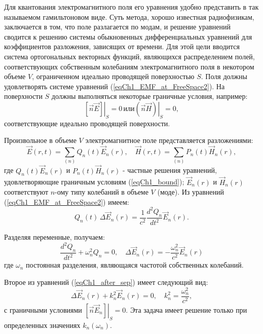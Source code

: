 Для квантования электромагнитного поля его уравнения удобно
представить в так называемом гамильтоновом виде. Суть метода, хорошо
известная радиофизикам, заключается в том, что поле разлагается по
модам, и решение уравнений сводится к решению системы обыкновенных
дифференциальных уравнений для коэффициентов разложения, зависящих от
времени. Для этой цели вводится система ортогональных векторных
функций, являющихся распределением полей, соответствующих собственным
колебаниям электромагнитного поля в некотором объеме  $V$,  ограниченном
идеально проводящей поверхностью  $S$.  Поля должны удовлетворять
системе уравнений (\ref{eqCh1_EMF_at_FreeSpace2}). На поверхности  $S$
должны выполняться некоторые граничные условия, например: 
\begin{equation}
\left. \left[ \vec{n} \vec{E} \right] \right|_S = 0 \,
\mbox{или}
\left. \left( \vec{n} \vec{H} \right) \right|_S = 0,
\label{eqCh1_bound}
\end{equation}
соответствующие идеально проводящей поверхности.

Произвольное в объеме $V$ электромагнитное поле представляется 
разложениями:
\begin{equation}
\vec{E}\left(r, t\right) = \sum_{(n)} Q_n\left(t\right)\vec{E}_n\left(r\right),
\quad
\vec{H}\left(r, t\right) = \sum_{(n)} P_n\left(t\right)\vec{H}_n\left(r\right),
\label{eqCh1_sep0}
\end{equation}
где $Q_n\left(t\right)\vec{E}_n\left(r\right)$ и 
$P_n\left(t\right)\vec{H}_n\left(r\right)$  - 
частные решения уравнений, удовлетворяющие граничным условиям
(\ref{eqCh1_bound}); $\vec{E}_n\left(r\right)$ и  
$\vec{H}_n\left(r\right)$  соответствуют $n$-ому типу 
колебаний в объеме  $V$  (моде).
Из уравнений (\ref{eqCh1_EMF_at_FreeSpace2}) имеем:
\begin{equation}
Q_n\left(t\right) \, \Delta \vec{E}_n\left(r\right) = 
\frac{1}{c^2} \frac{d^2 Q_n}{d t^2}\vec{E}_n\left(r\right). 
\end{equation}

Разделяя переменные, получаем:
\begin{equation}
\frac{d^2 Q_n}{d t^2} + \omega_n^2 Q_n = 0,
\quad
\Delta \vec{E}_n \left(r\right) = - \frac{\omega_n^2}{c^2} 
\vec{E}_n \left(r\right)
\label{eqCh1_after_sep}
\end{equation}
где $\omega_n$ постоянная разделения, являющаяся частотой собственных
колебаний.

Второе из уравнений (\ref{eqCh1_after_sep}) имеет следующий вид:
\begin{equation}
\Delta \vec{E}_n\left(r\right) + k_n^2 \vec{E}_n\left(r\right) = 0,
\quad
k_n^2 = \frac{\omega_n^2}{c^2},
\end{equation}
с граничными условиями  
$\left. \left[ \vec{n} \vec{E}_n \right] \right|_S = 0$.  Эта
задача имеет решение только при определенных значениях  
$k_n\left(\omega_n\right)$.  

